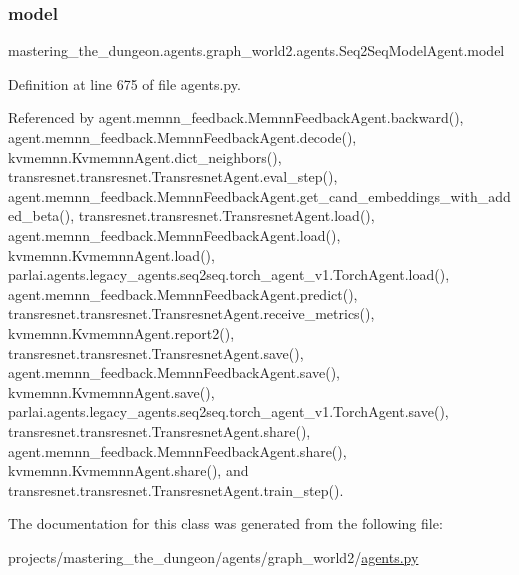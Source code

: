 \subsubsection{\texorpdfstring{model}{model}}
{\footnotesize\ttfamily mastering\+\_\+the\+\_\+dungeon.\+agents.\+graph\+\_\+world2.\+agents.\+Seq2\+Seq\+Model\+Agent.\+model}



Definition at line 675 of file agents.\+py.



Referenced by agent.\+memnn\+\_\+feedback.\+Memnn\+Feedback\+Agent.\+backward(), agent.\+memnn\+\_\+feedback.\+Memnn\+Feedback\+Agent.\+decode(), kvmemnn.\+Kvmemnn\+Agent.\+dict\+\_\+neighbors(), transresnet.\+transresnet.\+Transresnet\+Agent.\+eval\+\_\+step(), agent.\+memnn\+\_\+feedback.\+Memnn\+Feedback\+Agent.\+get\+\_\+cand\+\_\+embeddings\+\_\+with\+\_\+added\+\_\+beta(), transresnet.\+transresnet.\+Transresnet\+Agent.\+load(), agent.\+memnn\+\_\+feedback.\+Memnn\+Feedback\+Agent.\+load(), kvmemnn.\+Kvmemnn\+Agent.\+load(), parlai.\+agents.\+legacy\+\_\+agents.\+seq2seq.\+torch\+\_\+agent\+\_\+v1.\+Torch\+Agent.\+load(), agent.\+memnn\+\_\+feedback.\+Memnn\+Feedback\+Agent.\+predict(), transresnet.\+transresnet.\+Transresnet\+Agent.\+receive\+\_\+metrics(), kvmemnn.\+Kvmemnn\+Agent.\+report2(), transresnet.\+transresnet.\+Transresnet\+Agent.\+save(), agent.\+memnn\+\_\+feedback.\+Memnn\+Feedback\+Agent.\+save(), kvmemnn.\+Kvmemnn\+Agent.\+save(), parlai.\+agents.\+legacy\+\_\+agents.\+seq2seq.\+torch\+\_\+agent\+\_\+v1.\+Torch\+Agent.\+save(), transresnet.\+transresnet.\+Transresnet\+Agent.\+share(), agent.\+memnn\+\_\+feedback.\+Memnn\+Feedback\+Agent.\+share(), kvmemnn.\+Kvmemnn\+Agent.\+share(), and transresnet.\+transresnet.\+Transresnet\+Agent.\+train\+\_\+step().



The documentation for this class was generated from the following file\+:\begin{DoxyCompactItemize}
\item 
projects/mastering\+\_\+the\+\_\+dungeon/agents/graph\+\_\+world2/\hyperlink{projects_2mastering__the__dungeon_2agents_2graph__world2_2agents_8py}{agents.\+py}\end{DoxyCompactItemize}
